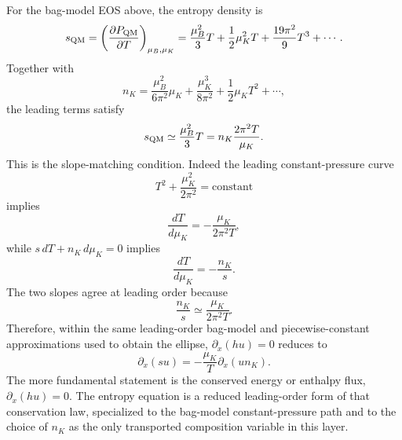 For the bag-model EOS above, the entropy density is
\begin{equation}
s_{\rm QM}
=
\left(\frac{\partial P_{\rm QM}}{\partial T}\right)_{\mu_B,\mu_K}
=
\frac{\mu_B^2}{3}T
+
\frac{1}{2}\mu_K^2T
+
\frac{19\pi^2}{9}T^3
+\cdots .
\end{equation}
Together with
\begin{equation}
n_K
=
\frac{\mu_B^2}{6\pi^2}\mu_K
+
\frac{\mu_K^3}{8\pi^2}
+
\frac{1}{2}\mu_KT^2
+\cdots ,
\end{equation}
the leading terms satisfy
\begin{equation}
s_{\rm QM}
\simeq
\frac{\mu_B^2}{3}T
=
n_K\frac{2\pi^2T}{\mu_K}.
\end{equation}
This is the slope-matching condition. Indeed the leading constant-pressure
curve
\begin{equation}
T^2+\frac{\mu_K^2}{2\pi^2}
=
\mathrm{constant}
\end{equation}
implies
\begin{equation}
\frac{dT}{d\mu_K}
=
-\frac{\mu_K}{2\pi^2T},
\end{equation}
while \(s\,dT+n_K\,d\mu_K=0\) implies
\begin{equation}
\frac{dT}{d\mu_K}
=
-\frac{n_K}{s}.
\end{equation}
The two slopes agree at leading order because
\begin{equation}
\frac{n_K}{s}
\simeq
\frac{\mu_K}{2\pi^2T}.
\end{equation}
Therefore, within the same leading-order bag-model and piecewise-constant
approximations used to obtain the ellipse, \(\partial_x(hu)=0\) reduces to
\begin{equation}
\partial_x(su)
=
-\frac{\mu_K}{T}\partial_x(un_K).
\end{equation}
The more fundamental statement is the conserved energy or enthalpy flux,
\(\partial_x(hu)=0\). The entropy equation is a reduced leading-order form of
that conservation law, specialized to the bag-model constant-pressure path and
to the choice of \(n_K\) as the only transported composition variable in this
layer.

